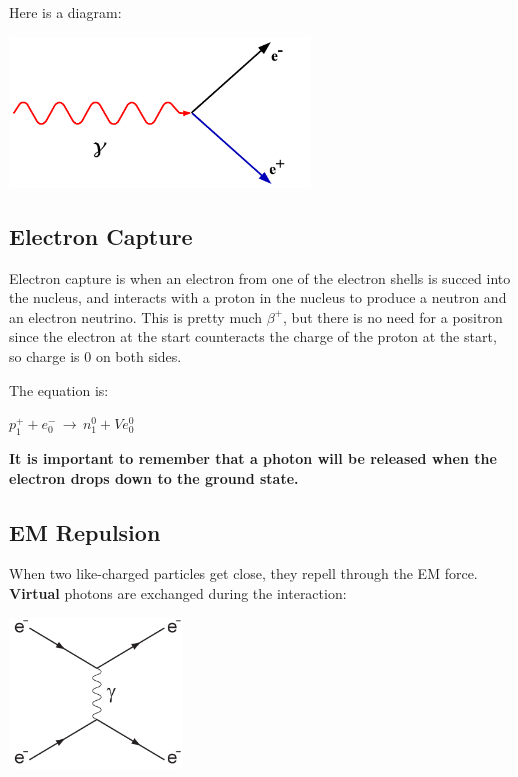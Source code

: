 \documentclass[a4paper, 12pt]{article}
\begin{document}
Here is a diagram:

\begin{center}
\includegraphics[height=4cm]{pairProduction.png}
\end{center}

\subsection{Electron Capture}

Electron capture is when an electron from one of the electron shells is succed into the nucleus, and interacts with a proton in the nucleus to produce a neutron and an electron neutrino. This is pretty much $\beta^+$, but there is no need for a positron since the electron at the start counteracts the charge of the proton at the start, so charge is 0 on both sides.

The equation is:

$p^+_1 + e^-_0 \, \rightarrow \, n^0_1 + Ve^0_0$

\textbf{It is important to remember that a photon will be released when the electron drops down to the ground state.}

\subsection{EM Repulsion}

When two like-charged particles get close, they repell through the EM force. \textbf{Virtual} photons are exchanged during the interaction:

\begin{center}
\includegraphics[height=4cm]{emRepulsion.png}
\end{center}
\end{document}
